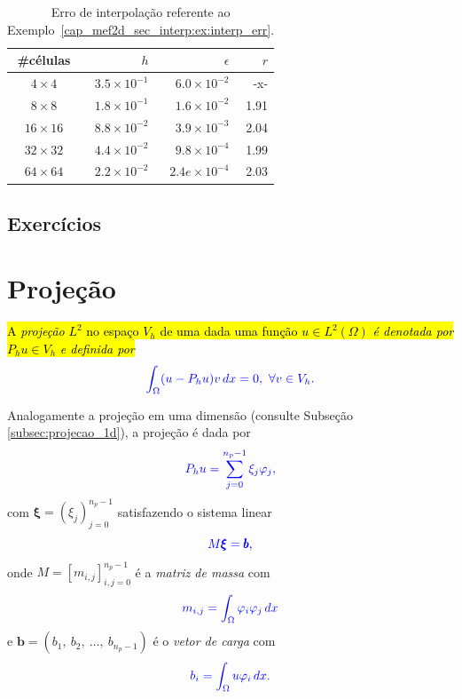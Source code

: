 \begin{ex}
  \begin{table}[H]
    \centering
    \caption{Erro de interpolação referente ao Exemplo~\ref{cap_mef2d_sec_interp:ex:interp_err}.}
    \begin{tabular}{cr|rr}\toprule
      \#células & $h$ & $\epsilon$ & $r$ \\\midrule
      $4\times 4$ & $3.5\times 10^{-1}$ & $6.0\times 10^{-2}$ & -x-\\
      $8\times 8$ & $1.8\times 10^{-1}$ & $1.6\times 10^{-2}$ & 1.91\\
      $16\times 16$ & $8.8\times 10^{-2}$ & $3.9\times 10^{-3}$ & 2.04 \\
      $32\times 32$ & $4.4\times 10^{-2}$ & $9.8\times 10^{-4}$ & 1.99\\
      $64\times 64$ & $2.2\times 10^{-2}$ & $2.4e\times 10^{-4}$ & 2.03\\\bottomrule
    \end{tabular}
    \label{cap_mef2d_sec_interp:tab:interp_err}
  \end{table}
\end{ex}

\subsection{Exercícios}
\badgeConstrucao

\section{Projeção}\label{cap_mef2d_sec_proj}
\badgeRevisar

\hl{A \emph{projeção} $L^2$ no espaço $V_h$ de uma dada uma função $u\in L^2(\Omega)$ \emph{é denotada por} $P_hu\in V_h$ \emph{e definida por}}
\begin{equation}\color{blue}\int_\Omega (u-P_hu)v\,dx = 0,~\forall v\in V_h.
\end{equation}

Analogamente a projeção em uma dimensão (consulte Subseção \ref{subsec:projecao_1d}), a projeção é dada por
\begin{equation}\color{blue}P_h u = \sum_{j=0}^{n_p-1} \xi_j\varphi_j,
\end{equation}
com $\pmb{\xi} = (\xi_j)_{j=0}^{n_p-1}$ satisfazendo o sistema linear
\begin{equation}\color{blue}M\pmb{\xi} = \pmb{b},
\end{equation}
onde $M = [m_{i,j}]_{i,j=0}^{n_p-1}$ é a \emph{matriz de massa} com
\begin{equation}\color{blue}m_{i,j} = \int_{\Omega} \varphi_i\varphi_j\,dx
\end{equation}
e $\pmb{b} = (b_1,~b_2,~\dotsc,~b_{n_p-1})$ é o \emph{vetor de carga} com
\begin{equation}\color{blue}b_i = \int_\Omega u\varphi_i\,dx.
\end{equation}

